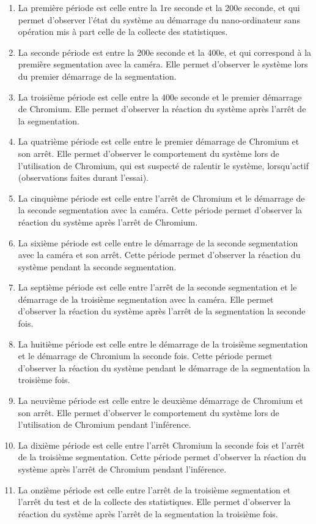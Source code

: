 \begin{enumerate}
   \item La première période est celle entre la 1re seconde et la 200e seconde, et qui permet d'observer l'état du système au démarrage du nano-ordinateur sans opération mis à part celle de la collecte des statistiques. 
   \item La seconde période est entre la 200e seconde et la 400e, et qui correspond à la première segmentation avec la caméra. Elle permet d'observer le système lors du premier démarrage de la segmentation. 
   \item La troisième période est celle entre la 400e seconde et le premier démarrage de Chromium. Elle permet d'observer la réaction du système après l'arrêt de la segmentation. 
   \item La quatrième période est celle entre le premier démarrage de Chromium et son arrêt. Elle permet d'observer le comportement du système lors de l'utilisation de Chromium, qui est suspecté de ralentir le système, lorsqu'actif (observations faites durant l'essai).
   \item La cinquième période est celle entre l'arrêt de Chromium et le démarrage de la seconde segmentation avec la caméra. Cette période permet d'observer la réaction du système après l'arrêt de Chromium. 
   \item La sixième période est celle entre le démarrage de la seconde segmentation avec la caméra et son arrêt. Cette période permet d'observer la réaction du système pendant la seconde segmentation. 
   \item La septième période est celle entre l'arrêt de la seconde segmentation et le démarrage de la troisième segmentation avec la caméra. Elle permet d'observer la réaction du système après l'arrêt de la segmentation la seconde fois. 
   \item La huitième période est celle entre le démarrage de la troisième segmentation et le démarrage de Chromium la seconde fois. Cette période permet d'observer la réaction du système pendant le démarrage de la segmentation la troisième fois. 
   \item La neuvième période est celle entre le deuxième démarrage de Chromium et son arrêt. Elle permet d'observer le comportement du système lors de l'utilisation de Chromium pendant l'inférence.
   \item La dixième période est celle entre l'arrêt Chromium la seconde fois et l'arrêt de la troisième segmentation. Cette période permet d'observer la réaction du système après l'arrêt de Chromium pendant l'inférence. 
   \item La onzième période est celle entre l'arrêt de la troisième segmentation et l'arrêt du test et de la collecte des statistiques. Elle permet d'observer la réaction du système après l'arrêt de la segmentation la troisième fois. 
\end{enumerate} 
